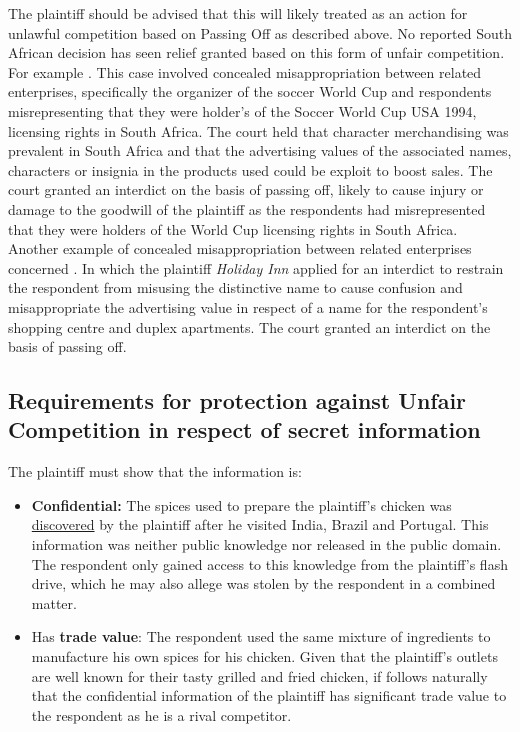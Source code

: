 \documentclass[11pt]{article}
\begin{document}
The plaintiff should be advised that this will likely treated as an action for
unlawful competition based on Passing Off as described above. No reported South
African decision has seen relief granted based on this form of unfair
competition.\\

For example  \cite{joffe94_fifa_bartlett}. This
case involved concealed misappropriation between related enterprises,
specifically the organizer of the soccer
World Cup and respondents misrepresenting that they were holder's of the Soccer
World Cup USA 1994, licensing rights in South Africa. The court held that
character merchandising was prevalent in South Africa and that the advertising
values of the associated names, characters or insignia in the products used
could be exploit to boost sales. The court granted an interdict on the basis of
passing off, likely to cause injury or damage to the goodwill of the plaintiff
as the respondents had misrepresented that they were holders of the World Cup
licensing rights in South Africa.\\

Another example of concealed misappropriation between related enterprises
concerned 
\cite{holmes77_capital_v_holiday}. In which the plaintiff \emph{Holiday Inn} applied
for an interdict to restrain the respondent from misusing the distinctive name to
cause confusion and misappropriate the advertising value in respect of a name
for the respondent's shopping centre and duplex apartments. The court granted an
interdict on the basis of passing off.
\subsection{Requirements for protection against Unfair Competition in respect of secret information}
\label{sec:org304851b}

The plaintiff must show that the information is:
\begin{itemize}
\item \textbf{Confidential:} The spices used to prepare the plaintiff's chicken was
\uline{discovered} by the plaintiff after he visited India, Brazil and
Portugal. This information was neither public knowledge nor released in the
public domain. The respondent only gained access to this knowledge from the
plaintiff's flash drive, which he may also allege was stolen by the respondent
in a combined matter.
\item Has \textbf{trade value}: The respondent used the same mixture of ingredients to
manufacture his own spices for his chicken. Given that the plaintiff's outlets
are well known for their tasty grilled and fried chicken, if follows naturally
that the confidential information of the plaintiff has significant trade value
to the respondent as he is a rival competitor.
\end{itemize}
\end{document}
